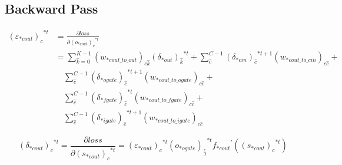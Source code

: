 \documentclass[runningheads,openany]{xhlPaper}
\begin{document}
\subsection{Backward Pass}

\begin{equation}
\begin{aligned}
{\left( {{\varepsilon _{*cout}}} \right)_c}^{*t} &= \frac{{\partial loss}}{{\partial {{\left( {{o_{*cout}}} \right)}_c}^{*t}}} \\
&= \sum\limits_{\hat k = 0}^{K - 1} {{{\left( {{w_{*cout\_to\_out}}} \right)}_{c\hat k}}{{\left( {{\delta _{*out}}} \right)}_{\hat k}}^{*t}}  + \sum\limits_{\hat c}^{C - 1} {{{\left( {{\delta _{*cin}}} \right)}_{\hat c}}^{*t + 1}{{\left( {{w_{*cout\_to\_cin}}} \right)}_{c\hat c}}}  + \\
&\quad\sum\limits_{\hat c}^{C - 1} {{{\left( {{\delta _{*ogate}}} \right)}_{\hat c}}^{*t + 1}{{\left( {{w_{*cout\_to\_ogate}}} \right)}_{c\hat c}}}  + \\
&\quad\sum\limits_{\hat c}^{C - 1} {{{\left( {{\delta _{*fgate}}} \right)}_{\hat c}}^{*t}{{\left( {{w_{*cout\_to\_fgate}}} \right)}_{c\hat c}}}  + \\
&\quad\sum\limits_{\hat c}^{C - 1} {{{\left( {{\delta _{*igate}}} \right)}_{\hat c}}^{*t + 1}{{\left( {{w_{*cout\_to\_igate}}} \right)}_{c\hat c}}} 
\end{aligned}
\end{equation}

\begin{equation}
{\left( {{\delta _{*cout}}} \right)_c}^{*t} = \frac{{\partial loss}}{{\partial {{\left( {{s_{*cout}}} \right)}_c}^{*t}}} = {\left( {{\varepsilon _{*cout}}} \right)_c}^{*t}{\left( {{o_{*ogate}}} \right)_{\frac{c}{J}}}^{*t}{f_{*cout}}^{'}\left( {{{\left( {{s_{*cout}}} \right)}_c}^{*t}} \right)
\end{equation}
\end{document}
